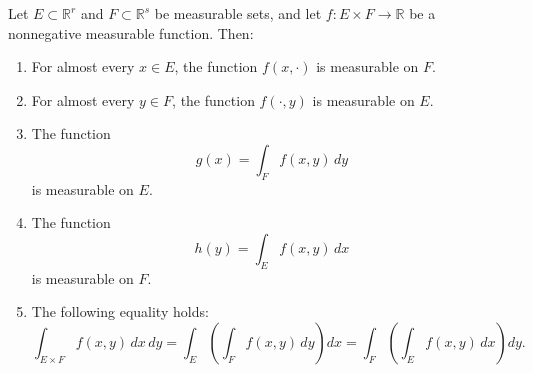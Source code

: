 \begin{theorem}
Let $E \subset \mathbb{R}^r$ and $F \subset \mathbb{R}^s$ be measurable sets, and let
$f : E \times F \to \mathbb{R}$ be a nonnegative measurable function. Then:

\begin{enumerate}
    \item For almost every $x \in E$, the function $f(x,\cdot)$ is measurable on $F$.
    \item For almost every $y \in F$, the function $f(\cdot,y)$ is measurable on $E$.
    \item The function
    \[
        g(x) = \int_F f(x,y)\,dy
    \]
    is measurable on $E$.
    \item The function
    \[
        h(y) = \int_E f(x,y)\,dx
    \]
    is measurable on $F$.
    \item The following equality holds:
    \[
        \int_{E\times F} f(x,y)\,dx\,dy
        =
        \int_E \left(\int_F f(x,y)\,dy\right) dx
        =
        \int_F \left(\int_E f(x,y)\,dx\right) dy.
    \]
\end{enumerate}
\end{theorem}

